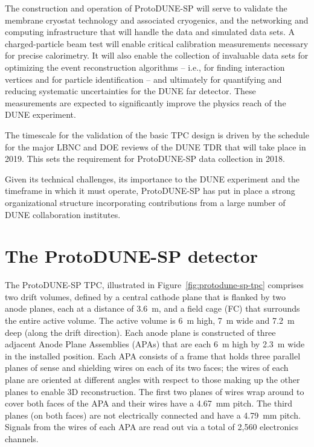 The construction and operation of ProtoDUNE-SP will serve to validate the membrane cryostat technology and associated cryogenics, and the networking and computing infrastructure that will handle the data and simulated data sets.
A charged-particle beam test will enable critical calibration measurements necessary for precise calorimetry. It will also enable the collection of invaluable data sets for optimizing the event reconstruction algorithms -- i.e., for finding interaction vertices and for particle identification -- and ultimately for quantifying and reducing systematic uncertainties for the DUNE far detector. These measurements are expected to significantly improve the physics reach of the DUNE experiment.

The timescale for the validation of the basic TPC design is driven by the schedule for the major LBNC and DOE reviews of the DUNE TDR that will take place in 2019. This sets the requirement for ProtoDUNE-SP data collection in 2018. 

Given its technical challenges, its importance to the DUNE experiment and the timeframe in which it must operate, ProtoDUNE-SP has put in place a strong organizational structure incorporating 
contributions from a large number of DUNE collaboration institutes. 

\section{The ProtoDUNE-SP detector}
\label{intro:detector}

The ProtoDUNE-SP TPC, illustrated in Figure~\ref{fig:protodune-sp-tpc} comprises two drift volumes, defined by  a central cathode plane that is flanked by two anode planes, each at a distance of 3.6~m, and a field cage (FC) that surrounds the entire active volume. The active volume is 6~m high, 7~m wide and 7.2~m deep (along the drift direction).
Each anode plane is constructed of three adjacent Anode Plane Assemblies (APAs) that are each 6~m high by 2.3~m wide in the installed position. Each APA consists of a frame that holds three parallel planes of sense and shielding wires on each of its two faces; the wires of each plane
  are oriented at different angles with respect to those making up the
  other planes to enable 3D reconstruction. The first two planes of
  wires wrap around to cover both faces of the APA and their wires have
  a 4.67~mm pitch.  The third planes (on both faces) are not
  electrically connected and have a 4.79~mm pitch.  Signals from the
  wires of each APA are read out via a total of 2,560 electronics
  channels.

